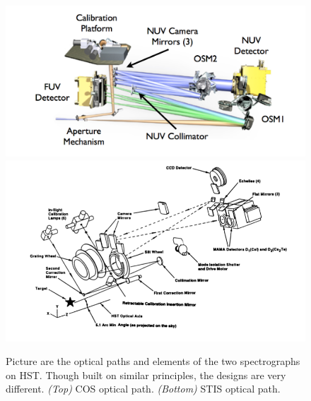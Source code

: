 \begin{figure}
\centering
\begin{minipage}[b]{.9\linewidth}
\includegraphics[width=\linewidth]{cos_optical.png}
\includegraphics[width=\linewidth]{stis_optical.png}
\caption{Picture are the optical paths and elements of the two spectrographs on HST.  Though built on similar principles, the designs are very different.  \textit{(Top)} COS optical path.
\textit{(Bottom)} STIS optical path.}
\label{fig:x1d_2}
\end{minipage}
\end{figure}


